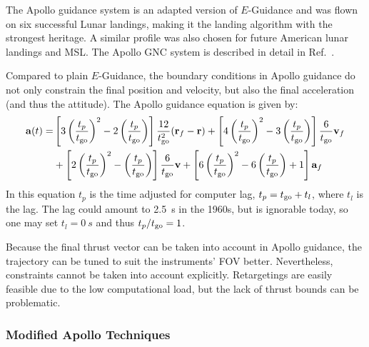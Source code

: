 \documentclass[%
]{aiaa-tc}
\begin{document}
The Apollo guidance system is an adapted version of $E$-Guidance and was flown
on six successful Lunar landings, making it the landing algorithm with the
strongest heritage. A similar profile was also chosen for future American lunar
landings and MSL.\cite{Paschall2009,Wong2006} The Apollo GNC system is described
in detail in Ref.~.

Compared to plain $E$-Guidance, the boundary conditions in Apollo guidance do
not only constrain the final position and velocity, but also the final
acceleration (and thus the attitude). The Apollo guidance equation is given
by:\cite{Bennett1970}
\begin{align}
\begin{split}
    \mathbf{a}(t) = & \left[3 \left(\frac{t_p}{t_{\text{go}}}\right)^2
	                 -2 \left(\frac{t_p}{t_{\text{go}}}\right)
	            \right]
	             \frac{12}{t_{\text{go}}^2} (\mathbf{r}_f - \mathbf{r}) +
	            \left[4 \left(\frac{t_p}{t_{\text{go}}}\right)^2
	                 -3 \left(\frac{t_p}{t_{\text{go}}}\right)
	            \right]
	             \frac{6}{t_{\text{go}}} \mathbf{v}_f \\ 
	             & +
	            \left[2 \left(\frac{t_p}{t_{\text{go}}}\right)^2
	                 -  \left(\frac{t_p}{t_{\text{go}}}\right)
	            \right]
	            \frac{6}{t_{\text{go}}} \mathbf{v} +
	            \left[6 \left(\frac{t_p}{t_{\text{go}}}\right)^2
	                 -6 \left(\frac{t_p}{t_{\text{go}}}\right) + 1
	            \right] \mathbf{a}_f
\end{split}
\end{align}
In this equation $t_p$ is the time adjusted for computer lag, $t_p = t_{\text{go}} +
t_l$, where $t_l$ is the lag. The lag could amount to \SI{2.5}{s} in the
1960s,\cite{Klumpp1971} but is ignorable today, so one may set $t_l =
\SI{0}{s}$ and thus $t_p/t_{\text{go}}=1$.

Because the final thrust vector can be taken into account in Apollo guidance,
the trajectory can be tuned to suit the instruments' FOV better.
Nevertheless, constraints cannot be taken into account explicitly. Retargetings
are easily feasible due to the low computational load, but the lack of thrust
bounds can be problematic.

\subsubsection{Modified Apollo Techniques}
\end{document}
